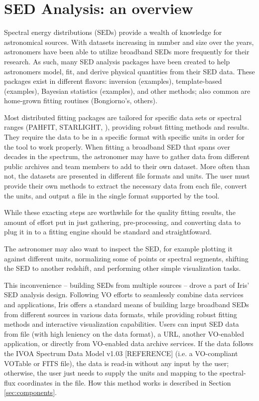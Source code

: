 \label{everyday_seds}
\section{SED Analysis: an overview}

Spectral energy distributions (SEDs) provide a wealth of knowledge for astronomical sources. With datasets increasing in number and size over the years, astronomers have been able to utilize broadband SEDs more frequently for their research. As such, many SED analysis packages have been created to help astronomers model, fit, and derive physical quantities from their SED data. These packages exist in different flavors: inversion (examples), template-based (examples), Bayesian statistics (examples), and other methods; also common are home-grown fitting routines (Bongiorno's, others). 

Most distributed fitting packages are tailored for specific data sets or spectral ranges (PAHFIT, STARLIGHT, ), providing robust fitting methods and results. They require the data to be in a specific format with specific units in order for the tool to work properly. When fitting a broadband SED that spans over decades in the spectrum, the astronomer may have to gather data from different public archives and team members to add to their own dataset. More often than not, the datasets are presented in different file formats and units. The user must provide their own methods to extract the necessary data from each file, convert the units, and output a file in the single format supported by the tool.

While these exacting steps are worthwhile for the quality fitting results, the amount of effort put in just gathering, pre-processing, and converting data to plug it in to a fitting engine should be standard and straightfoward.

The astronomer may also want to inspect the SED, for example plotting it against different units, normalizing some of points or spectral segments, shifting the SED to another redshift, and performing other simple visualization tasks.

This inconvenience -- building SEDs from multiple sources -- drove a part of Iris' SED analysis design. Following VO efforts to seamlessly combine data services and applications, Iris offers a standard means of building large broadband SEDs from different sources in various data formats, while providing robust fitting methods and interactive visualization capabilities. Users can input SED data from file (with high leniency on the data format), a URL, another VO-enabled application, or directly from VO-enabled data archive services. If the data follows the IVOA Spectrum Data Model v1.03 [REFERENCE] (i.e. a VO-compliant VOTable or FITS file), the data is read-in without any input by the user; otherwise, the user just needs to supply the units and  mapping to the spectral-flux coordinates in the file. How this method works is described in Section \ref{sec:components}. 

